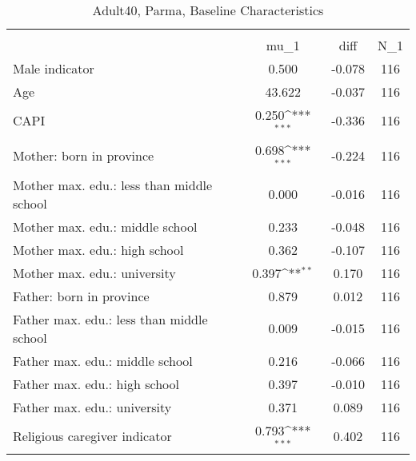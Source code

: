 \begin{table}[htbp]\centering
\def\sym#1{\ifmmode^{#1}\else\(^{#1}\)\fi}
\caption{Adult40, Parma, Baseline Characteristics}
\begin{tabular}{l*{1}{ccc}}
\toprule
                    &\multicolumn{3}{c}{}                           \\
                    &        mu\_1         &        diff&         N\_1\\
\midrule
Male indicator      &       0.500         &      -0.078&         116\\
Age                 &      43.622         &      -0.037&         116\\
CAPI                &       0.250\sym{***}&      -0.336&         116\\
Mother: born in province&       0.698\sym{***}&      -0.224&         116\\
Mother max. edu.: less than middle school&       0.000         &      -0.016&         116\\
Mother max. edu.: middle school&       0.233         &      -0.048&         116\\
Mother max. edu.: high school&       0.362         &      -0.107&         116\\
Mother max. edu.: university&       0.397\sym{**} &       0.170&         116\\
Father: born in province&       0.879         &       0.012&         116\\
Father max. edu.: less than middle school&       0.009         &      -0.015&         116\\
Father max. edu.: middle school&       0.216         &      -0.066&         116\\
Father max. edu.: high school&       0.397         &      -0.010&         116\\
Father max. edu.: university&       0.371         &       0.089&         116\\
Religious caregiver indicator&       0.793\sym{***}&       0.402&         116\\
\bottomrule
\end{tabular}
\end{table}
